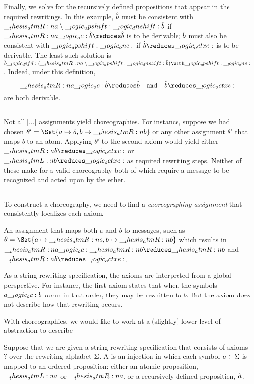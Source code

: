 Finally, we solve for the recursively defined propositions that appear in the required rewritings.
In this example, $\hat{b}$ must be consistent with $\__thesis_atmR:n {a} \mathbin { \setminus } \__logic_upshift: \__logic_dnshift: \hat{b}$ if $\atmR{a} \oc \defp{b} \reduces \defp{b}$ is to be derivable;
$\hat{b}$ must also be consistent with $\__logic_upshift: \__logic_one:$ if $\defp{b} \reduces \octxe$ is to be derivable.
The least such solution is $\defp{b} \defd (\atmR{a} \limp \up \dn \defp{b}) \with \up \one$.
Indeed, under this definition, 
\begin{equation*}
  \atmR{a} \oc \defp{b} \reduces \defp{b}
  \quad\text{and}\quad
  \defp{b} \reduces \octxe
\end{equation*}
are both derivable.

\subsection{}

Not all [...] assignments yield choreographies.
For instance, suppose we had chosen $\theta' = \Set{a \mapsto \defp{a} , b \mapsto \atmR{b}}$ or any other assignment $\theta'$ that maps $b$ to an atom.
Applying $\theta'$ to the second axiom would yield either $\atmR{b} \reduces \octxe$ or $\atmL{b} \reduces \octxe$ as required rewriting steps.
Neither of these make for a valid choreography both of which require a message to be recognized and acted upon by the ether.


\subsection{}

To construct a choreography, we need to find a \emph{choreographing assignment} that consistently localizes each axiom.

An assignment that maps both $a$ and $b$ to messages, such as $\theta = \Set{a \mapsto \atmR{a} , b \mapsto \atmR{b}}$ which results in $\atmR{a} \oc \atmR{b} \reduces \atmR{b}$  and $\atmR{b} \reduces \octxe$,
 

  
As a string rewriting specification, the axioms are interpreted from a global perspective.
For instance, the first axiom states that when the symbols $a \__logic_oc: b$ occur in that order, they may be rewritten to $b$.
But the axiom does not describe how that rewriting occurs.

With choreographies, we would like to work at a (slightly) lower level of abstraction to describe 


Suppose that we are given a string rewriting specification that consists of axioms $?$ over the rewriting alphabet $\Sigma$.
A  is an injection in which each symbol $a \in \Sigma$ is mapped to an ordered proposition: either an atomic proposition, $\__thesis_atmL:n {a}$ or $\__thesis_atmR:n {a}$, or a recursively defined proposition, $\hat{a}$.

